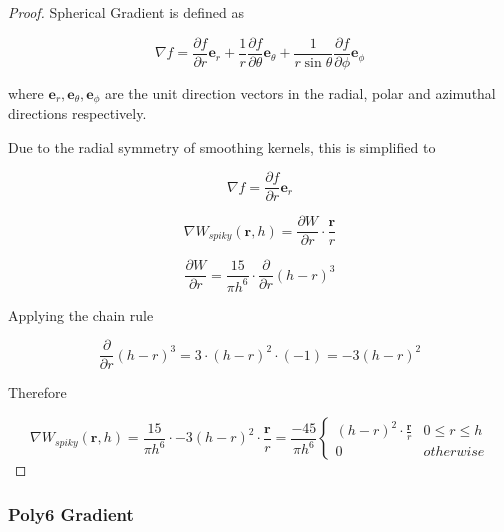 \documentclass[12pt]{article}
\begin{document}
    \begin{proof}
        Spherical Gradient is defined as

        $$\nabla f = \frac{\partial{f}}{\partial{r}}\textbf{e}_r + \frac{1}{r}\frac{\partial{f}}{\partial{\theta}}\textbf{e}_{\theta} + \frac{1}{r \sin{\theta}}\frac{\partial{f}}{\partial{\phi}}\textbf{e}_{\phi}$$
        
        where $\textbf{e}_{r}, \textbf{e}_{\theta}, \textbf{e}_{\phi}$ are the unit direction vectors in the radial, polar and azimuthal directions respectively.

        Due to the radial symmetry of smoothing kernels, this is simplified to

        $$\nabla f = \frac{\partial{f}}{\partial{r}}\textbf{e}_r$$

        $$\nabla W_{spiky}(\textbf{r}, h) = \frac{\partial{W}}{\partial{r}} \cdot \frac{\textbf{r}}{r}$$

        $$\frac{\partial{W}}{\partial{r}} = \frac{15}{\pi{h}^6} \cdot \frac{\partial}{\partial{r}} (h - r)^3$$

        Applying the chain rule

        $$\frac{\partial}{\partial{r}} (h - r)^3 = 3 \cdot (h - r)^2 \cdot (-1) = -3(h - r)^2$$

        Therefore

        $$\nabla{W_{spiky}(\textbf{r}, h)} = \frac{15}{\pi{h}^6} \cdot -3(h - r)^2 \cdot \frac{\textbf{r}}{r} = \frac{-45}{\pi{h}^6}\begin{cases}
            (h - r)^2 \cdot \frac{\textbf{r}}{r} & 0 \leq r \leq h \\
            0 & otherwise
        \end{cases}$$
    \end{proof}

    \subsubsection{Poly6 Gradient}
\end{document}
